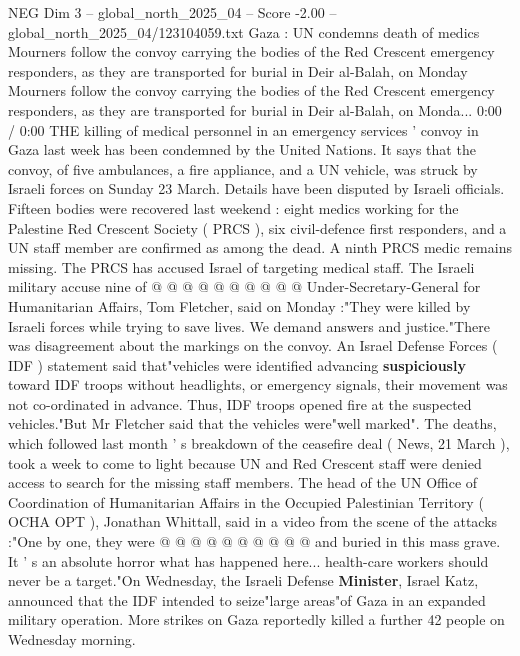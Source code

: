 \begin{textsample}{NEG Dim 3 – global\_north\_2025\_04 – Score -2.00 – global\_north\_2025\_04/123104059.txt}  \label{ex:f3_neg_398}
Gaza : UN condemns death of medics Mourners follow the convoy carrying the bodies of the Red Crescent emergency responders, as they are transported for burial in Deir al-Balah, on Monday Mourners follow the convoy carrying the bodies of the Red Crescent emergency responders, as they are transported for burial in Deir al-Balah, on Monda... 0:00 / 0:00 THE killing of medical personnel in an emergency services ' convoy in Gaza last week has been condemned by the United Nations.
It says that the convoy, of five ambulances, a fire appliance, and a UN vehicle, was struck by Israeli forces on Sunday 23 March.
Details have been disputed by Israeli officials.
Fifteen bodies were recovered last weekend : eight medics working for the Palestine Red Crescent Society ( PRCS ), six civil-defence first responders, and a UN staff member are confirmed as among the dead.
A ninth PRCS medic remains missing.
The PRCS has accused Israel of targeting medical staff.
The Israeli military accuse nine of @ @ @ @ @ @ @ @ @ @ Under-Secretary-General for Humanitarian Affairs, Tom Fletcher, said on Monday :"They were killed by Israeli forces while trying to save lives.
We demand answers and justice."There was disagreement about the markings on the convoy.
An Israel Defense Forces ( IDF ) statement said that"vehicles were identified advancing \textbf{suspiciously} toward IDF troops without headlights, or emergency signals, their movement was not co-ordinated in advance.
Thus, IDF troops opened fire at the suspected vehicles."But Mr Fletcher said that the vehicles were"well marked".
The deaths, which followed last month ' s breakdown of the ceasefire deal ( News, 21 March ), took a week to come to light because UN and Red Crescent staff were denied access to search for the missing staff members.
The head of the UN Office of Coordination of Humanitarian Affairs in the Occupied Palestinian Territory ( OCHA OPT ), Jonathan Whittall, said in a video from the scene of the attacks :"One by one, they were @ @ @ @ @ @ @ @ @ @ and buried in this mass grave.
It ' s an absolute horror what has happened here... health-care workers should never be a target."On Wednesday, the Israeli Defense \textbf{Minister}, Israel Katz, announced that the IDF intended to seize"large areas"of Gaza in an expanded military operation.
More strikes on Gaza reportedly killed a further 42 people on Wednesday morning.

\end{textsample}
